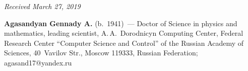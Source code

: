 
\hfill{\small\textit{Received March 27, 2019}}



\Contrl

\noindent
\textbf{Agasandyan Gennady A.} (b.\ 1941)~--- Doctor of Science in physics and mathematics, leading 
scientist, A.\,A.~Dorodnicyn Computing Center, Federal Research Center ``Computer Science and Control'' 
of the Russian Academy of Sciences, 40~Vavilov Str., Moscow 119333, Russian Federation; 
\mbox{agasand17@yandex.ru}

   
\label{end\stat}

\renewcommand{\bibname}{\protect\rm Литература}  
   